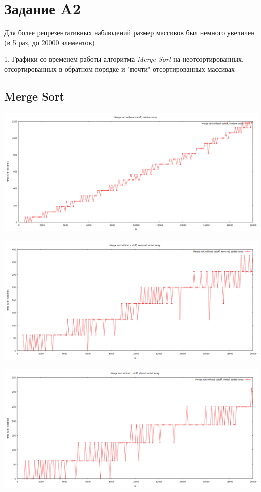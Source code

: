 \documentclass[11pt,a4paper]{article}
\begin{document}
\section*{Задание A2}

Для более репрезентативных наблюдений размер массивов был немного увеличен (в 5 раз, до 20000 элементов)

1. Графики со временем работы алгоритма \textit{Merge Sort} на неотсортированных, \\
отсортированных в обратном порядке и "почти" отсортированных массивах

\subsection*{Merge Sort}


\hspace*{-2cm} \includegraphics[scale=0.5]{merge_sort_random_data.PNG}

\hspace*{-2cm} \includegraphics[scale=0.5]{merge_sort_reversed_sorted_data.PNG}

\hspace*{-2cm} \includegraphics[scale=0.5]{merge_sort_almost_sorted_data.PNG}
\end{document}
